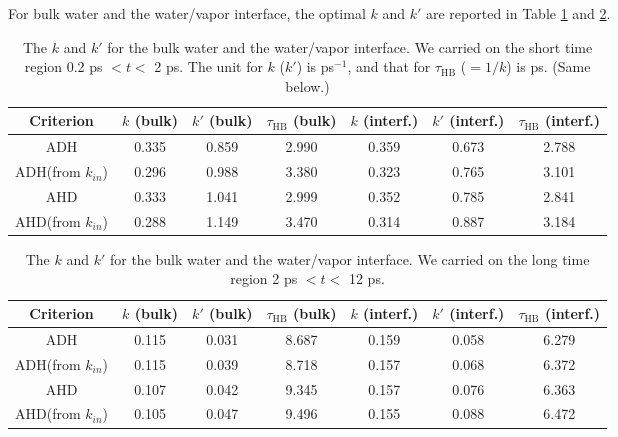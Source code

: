{\begin{equation}
\end{equation}
For bulk water and the water/vapor interface, the optimal $k$ and $k'$ are reported in Table 
\ref{tab:k_k_prime_128w_pure_1} and \ref{tab:k_k_prime_128w_pure_2}. 
% 
\begin{table}[htb]
\centering
\caption{\label{tab:k_k_prime_128w_pure_1} 
    The $k$ and $k'$ for the bulk water and the water/vapor interface. We carried on the short time region 0.2 ps $< t <$ 2 ps. 
    The unit for $k$ ($k'$) is ps$^{-1}$, and that for $\tau_{\text{HB}}$ ($=1/k$) is ps. (Same below.)
} 
\begin{tabular}{ccccccc}
 Criterion & $k$  (bulk) & $k'$ (bulk) & $\tau_{\text{HB}}$ (bulk) & $k$  (interf.) & $k'$ (interf.) & $\tau_{\text{HB}}$ (interf.)\\
\hline
  ADH & 0.335 & 0.859 & 2.990 & 0.359 & 0.673 & 2.788  \\
  ADH(from $k_{in}$) & 0.296  & 0.988 & 3.380  & 0.323 & 0.765 & 3.101 \\
  AHD & 0.333 & 1.041 & 2.999 & 0.352  & 0.785  &  2.841\\
  AHD(from $k_{in}$) & 0.288 & 1.149 & 3.470 & 0.314 & 0.887 & 3.184 \\
\end{tabular}
\end{table}
%
\begin{table}[htb]
\centering
\caption{\label{tab:k_k_prime_128w_pure_2} 
    The $k$ and $k'$ for the bulk water and the water/vapor interface. We carried on the long time region 2 ps $< t <$ 12 ps.
} 
\begin{tabular}{ccccccc}
 Criterion & $k$  (bulk) & $k'$ (bulk) & $\tau_{\text{HB}}$ (bulk) & $k$  (interf.) & $k'$ (interf.) & $\tau_{\text{HB}}$ (interf.)\\
\hline
  ADH & 0.115 & 0.031 & 8.687 & 0.159 & 0.058 & 6.279 \\
  ADH(from $k_{in}$) & 0.115  & 0.039 & 8.718 & 0.157  & 0.068 & 6.372\\
  AHD & 0.107 & 0.042 & 9.345  & 0.157 & 0.076 & 6.363 \\
  AHD(from $k_{in}$) & 0.105  & 0.047 & 9.496 & 0.155  & 0.088 & 6.472 \\
\end{tabular}
\end{table}
% 

}
